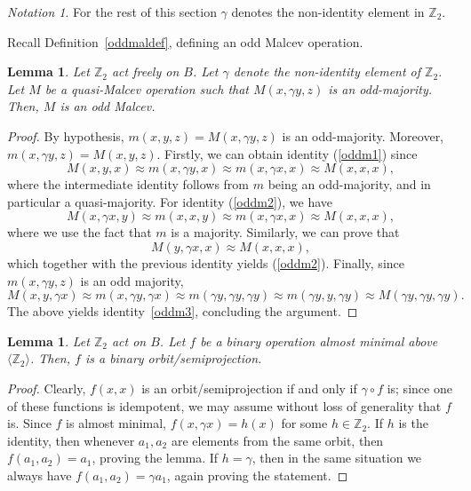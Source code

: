 \documentclass{article}
\newtheorem{lemma}[theorem]{Lemma}
\theoremstyle{remark}
\newtheorem{notation}[theorem]{Notation}
\theoremstyle{definition}
\begin{document}
\begin{notation}
    For the rest of this section $\gamma$ denotes the non-identity element in $\mathbb{Z}_2$.
\end{notation}

Recall Definition~\ref{oddmaldef}, defining an odd Malcev operation. 




\begin{lemma}\label{getoddMal} Let $\mathbb{Z}_2$ act freely on $B$. Let $\gamma$ denote the non-identity element of $\mathbb{Z}_2$. Let $M$ be a quasi-Malcev operation such that $M(x,\gamma y, z)$ is an odd-majority. Then, $M$ is an odd Malcev. 
\end{lemma}
\begin{proof} By hypothesis, $m(x,y,z)=M(x,\gamma y, z)$ is an odd-majority. Moreover, $m(x, \gamma y, z)=M(x, y, z)$. Firstly, we can obtain  identity (\ref{oddm1}) since
\[M(x,y,x)\approx m(x, \gamma y, x)\approx m(x, \gamma x, x)\approx M(x, x, x),\]
where the intermediate identity follows from $m$ being an odd-majority, and in particular a quasi-majority. For identity (\ref{oddm2}), we have 
\[M(x, \gamma x, y)\approx m(x, x, y)\approx m(x, \gamma x, x)\approx M(x, x, x),\]
where we use the fact that $m$ is a majority. Similarly, we can prove that
\[M(y, \gamma x, x)\approx M(x,x,x),\]
which together with the previous identity yields (\ref{oddm2}).
Finally, since $m(x, \gamma y, z)$ is an odd majority, 
\[M(x, y, \gamma x)\approx m(x, \gamma y, \gamma x)\approx m(\gamma y, \gamma y, \gamma y)\approx m(\gamma y, y, \gamma y)\approx M(\gamma y, \gamma y, \gamma y).\]
The above yields identity~\ref{oddm3}, concluding the argument.
\end{proof}

\begin{lemma} Let $\mathbb{Z}_2$ act on $B$. Let $f$ be a binary operation almost minimal above ${\langle \mathbb{Z}_2 \rangle}$. Then, $f$ is a binary orbit\-/semiprojection.
\end{lemma}
\begin{proof} Clearly, $f(x,x)$ is an orbit\-/semiprojection if and only if $\gamma\circ f$ is; since one of these functions is idempotent, we may assume without loss of generality that $f$ is. Since $f$ is almost minimal, $f(x, \gamma x)=h(x)$ for some $h\in \mathbb{Z}_2$. If $h$ is the identity, then whenever $a_1,a_2$ are elements from the same orbit, then $f(a_1,a_2)=a_1$, proving the lemma. If $h=\gamma$, then in the same situation we always have $f(a_1,a_2)=\gamma a_1$, again proving the statement.
\end{proof}
\end{document}
